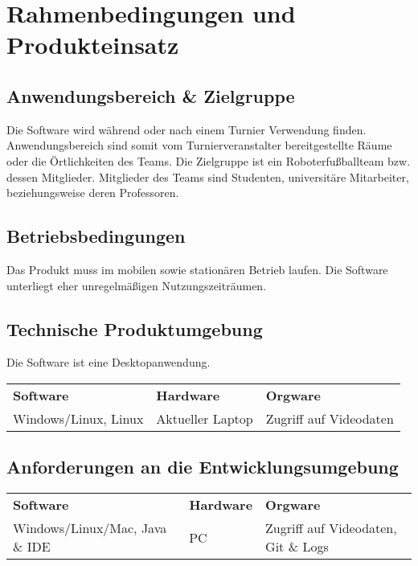 \chapter{Rahmenbedingungen und Produkteinsatz}
\section{Anwendungsbereich \& Zielgruppe} 
Die Software wird während oder nach einem Turnier Verwendung finden. Anwendungsbereich sind somit vom Turnierveranstalter bereitgestellte Räume oder die Örtlichkeiten des Teams.
Die Zielgruppe ist ein Roboterfußballteam bzw. dessen Mitglieder. Mitglieder des Teams sind Studenten, universitäre Mitarbeiter, beziehungsweise deren Professoren.
\section{Betriebsbedingungen}
Das Produkt muss im mobilen sowie stationären Betrieb laufen.
Die Software unterliegt eher unregelmäßigen Nutzungszeiträumen.
\section{Technische Produktumgebung}
Die Software ist eine Desktopanwendung.
\begin{center}
 \begin{tabular}{p{4cm}p{4cm}p{4cm}}
    \textbf{Software} & \textbf{Hardware} & \textbf{Orgware}\\
    Windows/Linux, Linux & Aktueller Laptop & Zugriff auf Videodaten
    \end{tabular}   
\end{center}
\section{Anforderungen an die Entwicklungsumgebung}
\begin{center}
    \begin{tabular}{p{4cm}p{4cm}p{4cm}}
       \textbf{Software} & \textbf{Hardware} & \textbf{Orgware}\\
       Windows/Linux/Mac, Java \& IDE & PC & Zugriff auf Videodaten, Git \& Logs
    \end{tabular}   
\end{center}